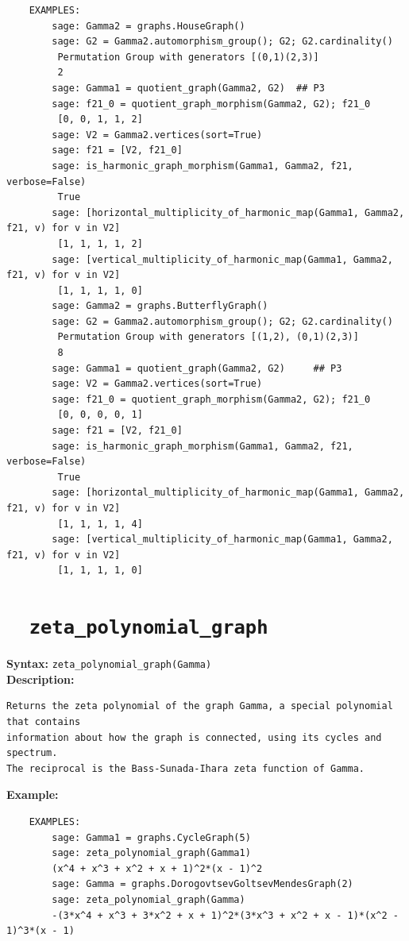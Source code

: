 \documentclass{article}
\begin{document}
\begin{verbatim}
    EXAMPLES:
        sage: Gamma2 = graphs.HouseGraph()  
        sage: G2 = Gamma2.automorphism_group(); G2; G2.cardinality() 
         Permutation Group with generators [(0,1)(2,3)]
         2
        sage: Gamma1 = quotient_graph(Gamma2, G2)  ## P3  
        sage: f21_0 = quotient_graph_morphism(Gamma2, G2); f21_0
         [0, 0, 1, 1, 2]                                                        
        sage: V2 = Gamma2.vertices(sort=True)  
        sage: f21 = [V2, f21_0] 
        sage: is_harmonic_graph_morphism(Gamma1, Gamma2, f21, verbose=False) 
         True
        sage: [horizontal_multiplicity_of_harmonic_map(Gamma1, Gamma2, f21, v) for v in V2] 
         [1, 1, 1, 1, 2]
        sage: [vertical_multiplicity_of_harmonic_map(Gamma1, Gamma2, f21, v) for v in V2]
         [1, 1, 1, 1, 0]
        sage: Gamma2 = graphs.ButterflyGraph()  
        sage: G2 = Gamma2.automorphism_group(); G2; G2.cardinality() 
         Permutation Group with generators [(1,2), (0,1)(2,3)]
         8
        sage: Gamma1 = quotient_graph(Gamma2, G2)     ## P3       
        sage: V2 = Gamma2.vertices(sort=True)   
        sage: f21_0 = quotient_graph_morphism(Gamma2, G2); f21_0   
         [0, 0, 0, 0, 1]
        sage: f21 = [V2, f21_0] 
        sage: is_harmonic_graph_morphism(Gamma1, Gamma2, f21, verbose=False)
         True
        sage: [horizontal_multiplicity_of_harmonic_map(Gamma1, Gamma2, f21, v) for v in V2] 
         [1, 1, 1, 1, 4]
        sage: [vertical_multiplicity_of_harmonic_map(Gamma1, Gamma2, f21, v) for v in V2] 
         [1, 1, 1, 1, 0]
\end{verbatim}

\section{\tt \ \ zeta\_polynomial\_graph}

\textbf{Syntax:} \verb}zeta_polynomial_graph(Gamma)}\\

\textbf{Description:}
\begin{verbatim}
Returns the zeta polynomial of the graph Gamma, a special polynomial that contains 
information about how the graph is connected, using its cycles and spectrum. 
The reciprocal is the Bass-Sunada-Ihara zeta function of Gamma. 
\end{verbatim}

\textbf{Example:}
\begin{verbatim}
    EXAMPLES:
        sage: Gamma1 = graphs.CycleGraph(5)
        sage: zeta_polynomial_graph(Gamma1)
        (x^4 + x^3 + x^2 + x + 1)^2*(x - 1)^2
        sage: Gamma = graphs.DorogovtsevGoltsevMendesGraph(2)
        sage: zeta_polynomial_graph(Gamma)
        -(3*x^4 + x^3 + 3*x^2 + x + 1)^2*(3*x^3 + x^2 + x - 1)*(x^2 - 1)^3*(x - 1)
\end{verbatim}
\end{document}
